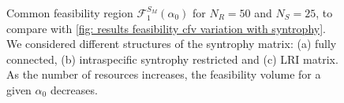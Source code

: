 \documentclass[12pt, titlepage]{report}
\begin{document}
\begin{figure}[h!]
\captionsetup[subfigure]{captionskip = -185pt, margin = 195pt}

\hspace{-0.1\linewidth}

\centering
{}
\caption{Common feasibility region $\mathcal{F}_1^{S_M}\left(\alpha_0\right)$ for $N_R=50$ and $N_S=25$, to compare with \ref{fig: results feasibility cfv variation with syntrophy}. We considered different structures of the syntrophy matrix: (a) fully connected, (b) intraspecific syntrophy restricted and (c) LRI matrix. As the number of resources increases, the feasibility volume for a given $\alpha_0$ decreases.}\label{fig: feasibility results common feasibility region NR=50 NS=25}
\end{figure}
\end{document}
